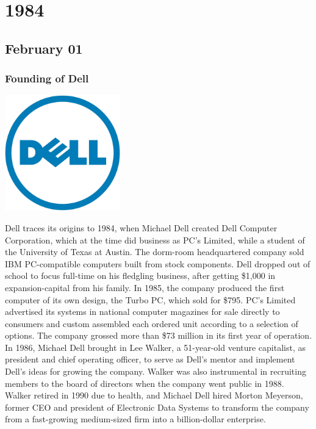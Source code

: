 \documentclass[11pt]{report}
\begin{document}
\chapter{1984}
\section{February 01}
\subsection{Founding of Dell}
\vspace{2mm}\begin{center}\includegraphics[width=5cm]{./img/dellLogo.jpg}\end{center}
Dell traces its origins to 1984, when Michael Dell created Dell Computer Corporation, which at the time did business as PC's Limited, while a student of the University of Texas at Austin. The dorm-room headquartered company sold IBM PC-compatible computers built from stock components. Dell dropped out of school to focus full-time on his fledgling business, after getting \$1,000 in expansion-capital from his family. In 1985, the company produced the first computer of its own design, the Turbo PC, which sold for \$795. PC's Limited advertised its systems in national computer magazines for sale directly to consumers and custom assembled each ordered unit according to a selection of options. The company grossed more than \$73 million in its first year of operation.\\
\indent In 1986, Michael Dell brought in Lee Walker, a 51-year-old venture capitalist, as president and chief operating officer, to serve as Dell's mentor and implement Dell's ideas for growing the company. Walker was also instrumental in recruiting members to the board of directors when the company went public in 1988. Walker retired in 1990 due to health, and Michael Dell hired Morton Meyerson, former CEO and president of Electronic Data Systems to transform the company from a fast-growing medium-sized firm into a billion-dollar enterprise.
\end{document}
